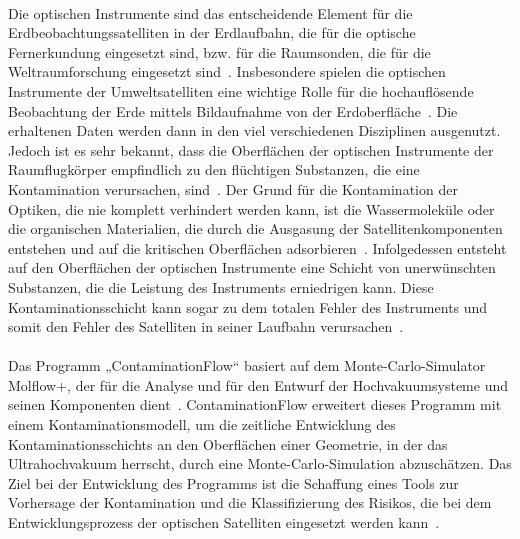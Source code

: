 \documentclass{listhesis}
\begin{document}
\paragraph{}
Die optischen Instrumente sind das entscheidende Element für die Erdbeobachtungssatelliten in der Erdlaufbahn, die für die optische Fernerkundung eingesetzt sind, bzw. für die Raumsonden, die für die Weltraumforschung eingesetzt sind~\cite{hammar}. Insbesondere spielen die optischen Instrumente der Umweltsatelliten eine wichtige Rolle für die hochauflösende Beobachtung der Erde mittels Bildaufnahme von der Erdoberfläche~\cite{umweltsatellit}. Die erhaltenen Daten werden dann in den viel verschiedenen Disziplinen ausgenutzt. 
Jedoch ist es sehr bekannt, dass die Oberflächen der optischen Instrumente der Raumflugkörper empfindlich zu den flüchtigen Substanzen, die eine Kontamination verursachen, sind~\cite{Jiao}. Der Grund für die Kontamination der Optiken, die nie komplett verhindert werden kann, ist die Wassermoleküle oder die organischen Materialien, die durch die Ausgasung der Satellitenkomponenten entstehen und auf die kritischen Oberflächen adsorbieren~\cite{schlappi}. Infolgedessen entsteht auf den Oberflächen der optischen Instrumente eine Schicht von unerwünschten Substanzen, die die Leistung des Instruments erniedrigen kann. Diese Kontaminationsschicht kann sogar zu dem totalen Fehler des Instruments und somit den Fehler des Satelliten in seiner Laufbahn verursachen~\cite{Jiao}.
\paragraph{}
Das Programm „ContaminationFlow“ basiert auf dem Monte-Carlo-Simulator Molflow+, der für die Analyse und für den Entwurf der Hochvakuumsysteme und seinen Komponenten dient~\cite{molflow1}. ContaminationFlow erweitert dieses Programm mit einem Kontaminationsmodell, um die zeitliche Entwicklung des Kontaminationsschichts an den Oberflächen einer Geometrie, in der das Ultrahochvakuum herrscht, durch eine Monte-Carlo-Simulation abzuschätzen. Das Ziel bei der Entwicklung des Programms ist die Schaffung eines Tools zur Vorhersage der Kontamination und die Klassifizierung des Risikos, die bei dem Entwicklungsprozess der optischen Satelliten eingesetzt werden kann~\cite{contaminaton}.
\end{document}
